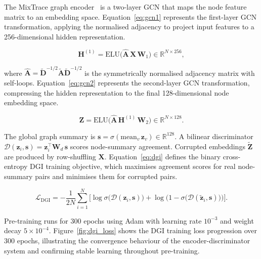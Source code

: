 \documentclass[12pt,a4paper]{article}
\begin{document}
The MixTrace graph encoder~\citep{velickovic2019dgi} is a
two-layer GCN that maps the node feature matrix to an
embedding space. Equation~\eqref{eq:gcn1} represents the
first-layer GCN transformation, applying the normalised
adjacency to project input features to a 256-dimensional
hidden representation.

\begin{equation}
  \mathbf{H}^{(1)} = \text{ELU}\!\bigl(
    \hat{\mathbf{A}}\,\mathbf{X}\,\mathbf{W}_1\bigr)
    \in \mathbb{R}^{N \times 256},
  \label{eq:gcn1}
\end{equation}

where $\hat{\mathbf{A}} = \tilde{\mathbf{D}}^{-1/2}
\tilde{\mathbf{A}}\tilde{\mathbf{D}}^{-1/2}$ is the
symmetrically normalised adjacency matrix with self-loops.
Equation~\eqref{eq:gcn2} represents the second-layer GCN
transformation, compressing the hidden representation to
the final 128-dimensional node embedding space.

\begin{equation}
  \mathbf{Z} = \text{ELU}\!\bigl(
    \hat{\mathbf{A}}\,\mathbf{H}^{(1)}\,\mathbf{W}_2\bigr)
    \in \mathbb{R}^{N \times 128}.
  \label{eq:gcn2}
\end{equation}

The global graph summary is $\mathbf{s} =
\sigma(\text{mean}_v\,\mathbf{z}_v) \in \mathbb{R}^{128}$.
A bilinear discriminator $\mathcal{D}(\mathbf{z}_i,
\mathbf{s}) = \mathbf{z}_i^\top \mathbf{W}_d\, \mathbf{s}$
scores node-summary agreement. Corrupted embeddings
$\tilde{\mathbf{Z}}$ are produced by row-shuffling
$\mathbf{X}$. Equation~\eqref{eq:dgi} defines the binary
cross-entropy DGI training objective, which maximises
agreement scores for real node-summary pairs and minimises
them for corrupted pairs.

\begin{equation}
  \mathcal{L}_\text{DGI} = -\frac{1}{2N}
    \sum_{i=1}^{N}\!\bigl[
      \log\sigma\!\bigl(\mathcal{D}(\mathbf{z}_i,
        \mathbf{s})\bigr)
      + \log\!\bigl(1 - \sigma\!\bigl(
          \mathcal{D}(\tilde{\mathbf{z}}_i,
          \mathbf{s})\bigr)\bigr)
    \bigr].
  \label{eq:dgi}
\end{equation}

Pre-training runs for 300 epochs using Adam with learning
rate $10^{-3}$ and weight decay $5 \times 10^{-4}$.
Figure~\ref{fig:dgi_loss} shows the DGI training loss
progression over 300 epochs, illustrating the convergence
behaviour of the encoder-discriminator system and
confirming stable learning throughout pre-training.
\end{document}
